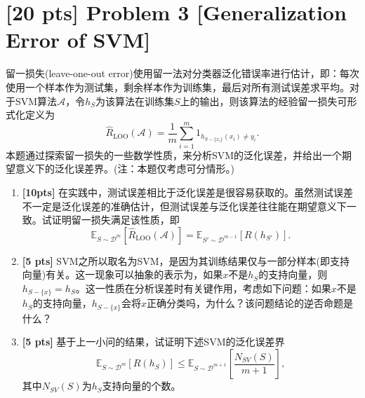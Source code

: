 \documentclass[a4paper,UTF8]{article}
\theoremstyle{definition}
\begin{document}
\section*{[20 pts] Problem 3 [Generalization Error of SVM]}

留一损失(leave-one-out error)使用留一法对分类器泛化错误率进行估计，即：每次使用一个样本作为测试集，剩余样本作为训练集，最后对所有测试误差求平均。对于SVM算法$\mathcal{A}$，令$h_S$为该算法在训练集$S$上的输出，则该算法的经验留一损失可形式化定义为
\begin{equation}
	\hat{R}_{\text{LOO}}(\mathcal{A}) = \frac{1}{m} \sum_{i=1}^m 1_{ h_{ S-\{x_i\} } (x_i) \neq y_i } . 
\end{equation}
本题通过探索留一损失的一些数学性质，来分析SVM的泛化误差，并给出一个期望意义下的泛化误差界。(注：本题仅考虑可分情形。)

\begin{enumerate}[(1)]
	\item \textbf{[10pts]} 在实践中，测试误差相比于泛化误差是很容易获取的。虽然测试误差不一定是泛化误差的准确估计，但测试误差与泛化误差往往能在期望意义下一致。试证明留一损失满足该性质，即
	\begin{equation}
		\mathbb{E}_{S \sim \mathcal{D}^m} [ \hat{R}_{\text{LOO} }(\mathcal{A}) ] = \mathbb{E}_{S' \sim \mathcal{D}^{m-1}} [ R(h_{S'}) ] . 
	\end{equation}
	\item \textbf{[5 pts]} SVM之所以取名为SVM，是因为其训练结果仅与一部分样本(即支持向量)有关。这一现象可以抽象的表示为，如果$x$不是$h_S$的支持向量，则$h_{S-\{x\}} = h_S$。这一性质在分析误差时有关键作用，考虑如下问题：如果$x$不是$h_S$的支持向量，$h_{S-\{x\}}$会将$x$正确分类吗，为什么？该问题结论的逆否命题是什么？
	\item \textbf{[5 pts]} 基于上一小问的结果，试证明下述SVM的泛化误差界
	\begin{equation}
		\mathbb{E}_{S \sim \mathcal{D}^m}[ R(h_S) ] \leqslant \mathbb{E}_{S \sim \mathcal{D}^{m+1}} \left[ \frac{N_{SV}(S)}{m+1} \right] , 
	\end{equation}
	其中$N_{SV}(S)$为$h_S$支持向量的个数。
\end{enumerate}
\end{document}
